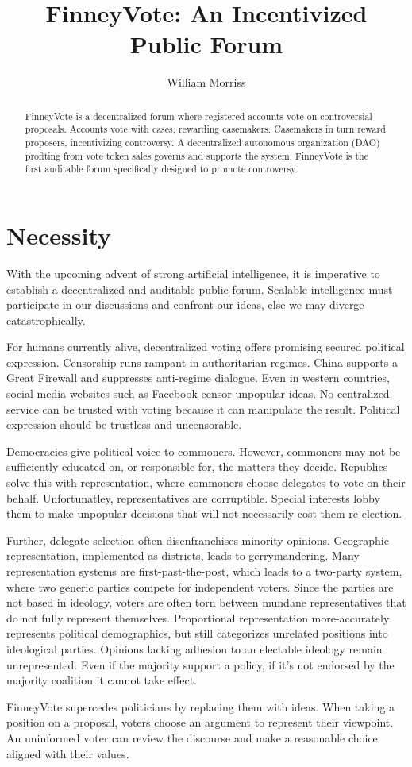 \documentclass{article}
\title{FinneyVote: An Incentivized Public Forum}
\author{William Morriss}
\begin{document}
\maketitle
\begin{abstract}
FinneyVote is a decentralized forum where registered accounts vote on controversial proposals.
Accounts vote with cases, rewarding casemakers.
Casemakers in turn reward proposers, incentivizing controversy.
A decentralized autonomous organization (DAO) profiting from vote token sales governs and supports the system.
FinneyVote is the first auditable forum specifically designed to promote controversy.
\end{abstract}
\section{Necessity}
With the upcoming advent of strong artificial intelligence, it is imperative to establish a decentralized and auditable public forum.
Scalable intelligence must participate in our discussions and confront our ideas, else we may diverge catastrophically.
\par
For humans currently alive, decentralized voting offers promising secured political expression.
Censorship runs rampant in authoritarian regimes.
China supports a Great Firewall and suppresses anti-regime dialogue.
Even in western countries, social media websites such as Facebook censor unpopular ideas.
No centralized service can be trusted with voting because it can manipulate the result.
Political expression should be trustless and uncensorable.
\par
Democracies give political voice to commoners.
However, commoners may not be sufficiently educated on, or responsible for, the matters they decide.
Republics solve this with representation, where commoners choose delegates to vote on their behalf.
Unfortunatley, representatives are corruptible.
Special interests lobby them to make unpopular decisions that will not necessarily cost them re-election.
\par
Further, delegate selection often disenfranchises minority opinions.
Geographic representation, implemented as districts, leads to gerrymandering.
Many representation systems are first-past-the-post, which leads to a two-party system, where two generic parties compete for independent voters.
Since the parties are not based in ideology, voters are often torn between mundane representatives that do not fully represent themselves.
Proportional representation more-accurately represents political demographics, but still categorizes unrelated positions into ideological parties.
Opinions lacking adhesion to an electable ideology remain unrepresented.
Even if the majority support a policy, if it's not endorsed by the majority coalition it cannot take effect.
\par
FinneyVote supercedes politicians by replacing them with ideas.
When taking a position on a proposal, voters choose an argument to represent their viewpoint.
An uninformed voter can review the discourse and make a reasonable choice aligned with their values.
\end{document}
